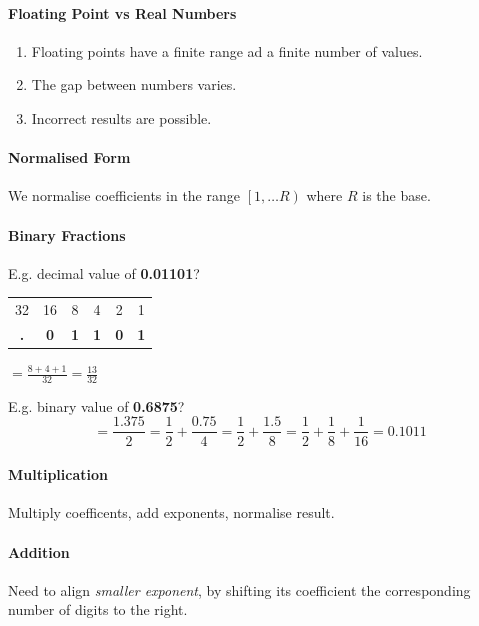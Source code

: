 \documentclass[twocolumn,english]{article}
\providecommand{\tabularnewline}{\\}
\begin{document}
\paragraph{Floating Point vs Real Numbers}
\begin{enumerate}
\item Floating points have a finite range ad a finite number of values.
\item The gap between numbers varies.
\item Incorrect results are possible.
\end{enumerate}

\paragraph{Normalised Form}

We normalise coefficients in the range $\left[1,\dots R\right)$ where
$R$ is the base.


\paragraph{Binary Fractions}

E.g. decimal value of \textbf{0.01101}?

\begin{table}[H]
\noindent \centering{}%
\begin{tabular}{cccccc}
\toprule 
32 & 16 & 8 & 4 & 2 & 1\tabularnewline
\textbf{.} & \textbf{0} & \textbf{1} & \textbf{1} & \textbf{0} & \textbf{1}\tabularnewline
\bottomrule
\end{tabular}$=\frac{8+4+1}{32}=\frac{13}{32}$
\end{table}


E.g. binary value of \textbf{0.6875}?
\[
=\frac{1.375}{2}=\frac{1}{2}+\frac{0.75}{4}=\frac{1}{2}+\frac{1.5}{8}=\frac{1}{2}+\frac{1}{8}+\frac{1}{16}=0.1011
\]



\paragraph{Multiplication}

Multiply coefficents, add exponents, normalise result.


\paragraph{Addition}

Need to align \emph{smaller exponent}, by shifting its coefficient
the corresponding number of digits to the right.
\end{document}
